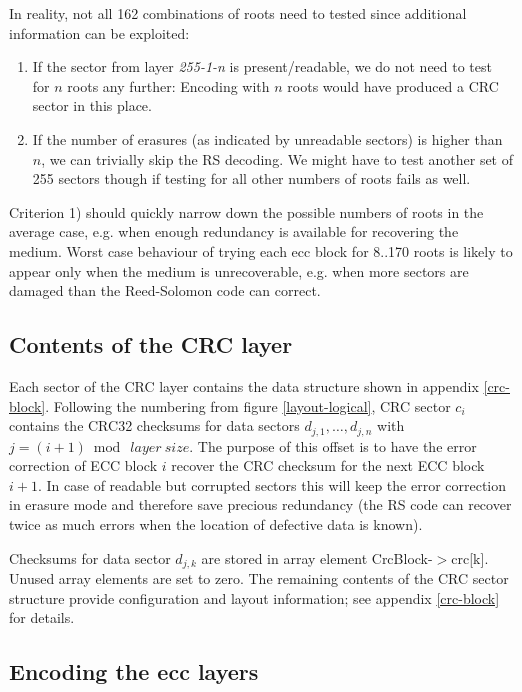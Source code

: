 \medskip

In reality, not all 162 combinations of roots need to tested since additional
information can be exploited:

\begin{enumerate}
\item If the sector from layer {\em 255-1-n} is present/readable,
we do not need to test for $n$ roots any further: Encoding with $n$ roots would
have produced a CRC sector in this place.
\item If the number of erasures (as indicated by unreadable sectors) is higher
than $n$, we can trivially skip the RS decoding. We might have to test another
set of 255 sectors though if testing for all other numbers of roots fails as well.
\end{enumerate}

Criterion 1) should quickly narrow down the possible numbers of roots
in the average case, e.g. when enough redundancy is available for recovering the medium.
Worst case behaviour of trying each ecc block for 8..170 roots is likely to appear only
when the medium is unrecoverable, e.g. when more sectors are damaged than the 
Reed-Solomon code can correct.

\subsection{Contents of the CRC layer}
\label{crc}

Each sector of the CRC layer contains the data structure shown in
appendix \ref{crc-block}. Following the numbering from figure \ref{layout-logical},
CRC sector $c_i$ contains the CRC32 checksums for data sectors $d_{j,1},\ldots,d_{j,n}$
with $j = (i+1)\bmod\ layer\ size$. The purpose of this offset is to have
the error correction of ECC block $i$ recover the CRC checksum for the next 
ECC block $i+1$. In case of readable but corrupted sectors this will keep the
error correction in erasure mode and therefore save precious redundancy (the
RS code can recover twice as much errors when the location of defective data
is known). \medskip

Checksums for data sector $d_{j,k}$ are stored in array element
CrcBlock-$>$crc[k]. Unused array elements are set to zero.
The remaining contents of the CRC sector structure provide 
configuration and layout information; see appendix \ref{crc-block} for details.

\subsection{Encoding the ecc layers}

